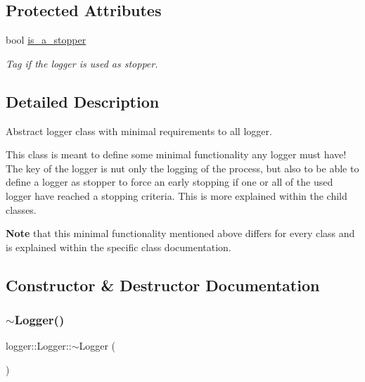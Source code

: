 \subsection*{Protected Attributes}
\begin{DoxyCompactItemize}
\item 
bool \hyperlink{classlogger_1_1_logger_a57ca2ab531e0a7ac74f4ecd4b74a938f}{is\+\_\+a\+\_\+stopper}
\begin{DoxyCompactList}\small\item\em Tag if the logger is used as stopper. \end{DoxyCompactList}\end{DoxyCompactItemize}


\subsection{Detailed Description}
Abstract logger class with minimal requirements to all logger. 

This class is meant to define some minimal functionality any logger must have! The key of the logger is nut only the logging of the process, but also to be able to define a logger as stopper to force an early stopping if one or all of the used logger have reached a stopping criteria. This is more explained within the child classes.

{\bfseries Note} that this minimal functionality mentioned above differs for every class and is explained within the specific class documentation. 

\subsection{Constructor \& Destructor Documentation}
\mbox{\label{classlogger_1_1_logger_aa85a309d218f9f006600cbaf2a348f52}} 
\subsubsection{\texorpdfstring{$\sim$\+Logger()}{~Logger()}}
{\footnotesize\ttfamily logger\+::\+Logger\+::$\sim$\+Logger (\begin{DoxyParamCaption}{ }\end{DoxyParamCaption})\hspace{0.3cm}{\ttfamily [virtual]}}



